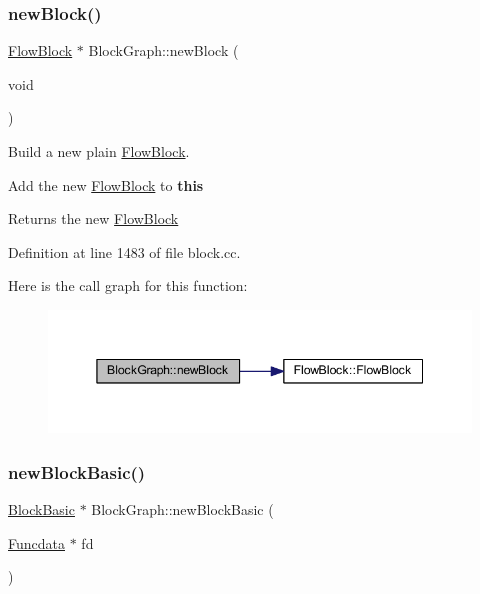 \subsubsection{\texorpdfstring{newBlock()}{newBlock()}}
{\footnotesize\ttfamily \mbox{\hyperlink{class_flow_block}{Flow\+Block}} $\ast$ Block\+Graph\+::new\+Block (\begin{DoxyParamCaption}\item[{void}]{ }\end{DoxyParamCaption})}



Build a new plain \mbox{\hyperlink{class_flow_block}{Flow\+Block}}. 

Add the new \mbox{\hyperlink{class_flow_block}{Flow\+Block}} to {\bfseries{this}} \begin{DoxyReturn}{Returns}
the new \mbox{\hyperlink{class_flow_block}{Flow\+Block}} 
\end{DoxyReturn}


Definition at line 1483 of file block.\+cc.

Here is the call graph for this function\+:
\nopagebreak
\begin{figure}[H]
\begin{center}
\leavevmode
\includegraphics[width=345pt]{class_block_graph_aa8afd0ba5e6abe328dee3b21473f0e2c_cgraph}
\end{center}
\end{figure}
\mbox{\label{class_block_graph_a0d05f223a305365c86c4b6efea82f1c0}} 
\subsubsection{\texorpdfstring{newBlockBasic()}{newBlockBasic()}}
{\footnotesize\ttfamily \mbox{\hyperlink{class_block_basic}{Block\+Basic}} $\ast$ Block\+Graph\+::new\+Block\+Basic (\begin{DoxyParamCaption}\item[{\mbox{\hyperlink{class_funcdata}{Funcdata}} $\ast$}]{fd }\end{DoxyParamCaption})}



